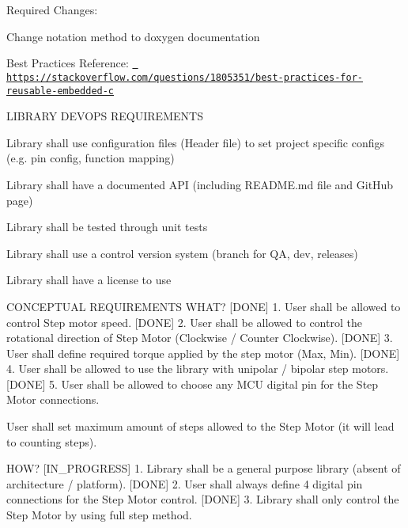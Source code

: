 Required Changes\+:
\begin{DoxyEnumerate}
\item Change notation method to doxygen documentation
\end{DoxyEnumerate}

Best Practices Reference\+: \href{https://stackoverflow.com/questions/1805351/best-practices-for-reusable-embedded-c}{\texttt{ https\+://stackoverflow.\+com/questions/1805351/best-\/practices-\/for-\/reusable-\/embedded-\/c}}

 L\+I\+B\+R\+A\+RY D\+E\+V\+O\+PS R\+E\+Q\+U\+I\+R\+E\+M\+E\+N\+TS


\begin{DoxyEnumerate}
\item Library shall use configuration files (Header file) to set project specific configs (e.\+g. pin config, function mapping)
\item Library shall have a documented A\+PI (including R\+E\+A\+D\+M\+E.\+md file and Git\+Hub page)
\item Library shall be tested through unit tests
\item Library shall use a control version system (branch for QA, dev, releases)
\item Library shall have a license to use
\end{DoxyEnumerate}

 C\+O\+N\+C\+E\+P\+T\+U\+AL R\+E\+Q\+U\+I\+R\+E\+M\+E\+N\+TS W\+H\+AT? \mbox{[}D\+O\+NE\mbox{]} 1. User shall be allowed to control Step motor speed. \mbox{[}D\+O\+NE\mbox{]} 2. User shall be allowed to control the rotational direction of Step Motor (Clockwise / Counter Clockwise). \mbox{[}D\+O\+NE\mbox{]} 3. User shall define required torque applied by the step motor (Max, Min). \mbox{[}D\+O\+NE\mbox{]} 4. User shall be allowed to use the library with unipolar / bipolar step motors. \mbox{[}D\+O\+NE\mbox{]} 5. User shall be allowed to choose any M\+CU digital pin for the Step Motor connections.
\begin{DoxyEnumerate}
\item User shall set maximum amount of steps allowed to the Step Motor (it will lead to counting steps).
\end{DoxyEnumerate}

H\+OW? \mbox{[}I\+N\+\_\+\+P\+R\+O\+G\+R\+E\+SS\mbox{]} 1. Library shall be a general purpose library (absent of architecture / platform). \mbox{[}D\+O\+NE\mbox{]} 2. User shall always define 4 digital pin connections for the Step Motor control. \mbox{[}D\+O\+NE\mbox{]} 3. Library shall only control the Step Motor by using full step method.


